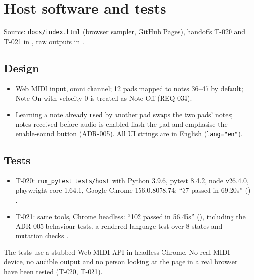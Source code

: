 \section{Host software and tests}
\label{sec:host}

Source: \nolinkurl{docs/index.html} (browser sampler, GitHub Pages), handoffs T-020
and T-021 in , raw outputs in
.

\subsection{Design}
\begin{itemize}[noitemsep]
  \item Web MIDI input, omni channel; 12 pads mapped to notes 36--47 by default;
        Note On with velocity 0 is treated as Note Off (REQ-034).
  \item Learning a note already used by another pad swaps the two pads' notes;
        notes received before audio is enabled flash the pad and emphasise the
        enable-sound button (ADR-005). All UI strings are in English
        (\texttt{lang="en"}).
\end{itemize}

\subsection{Tests}
\begin{itemize}[noitemsep]
  \item T-020: \nolinkurl{run_pytest} \nolinkurl{tests/host} with Python 3.9.6, pytest 8.4.2,
        node v26.4.0, playwright-core 1.64.1, Google Chrome 156.0.8078.74:
        ``37 passed in 69.20s'' ()
        .
  \item T-021: same tools, Chrome headless: ``102 passed in 56.45s''
        (), including the ADR-005 behaviour tests, a rendered
        language test over 8 states and mutation checks
        .
\end{itemize}
\noindent The tests use a stubbed Web MIDI API in headless Chrome. No real MIDI
device, no audible output and no person looking at the page in a real browser
have been tested (T-020, T-021).
